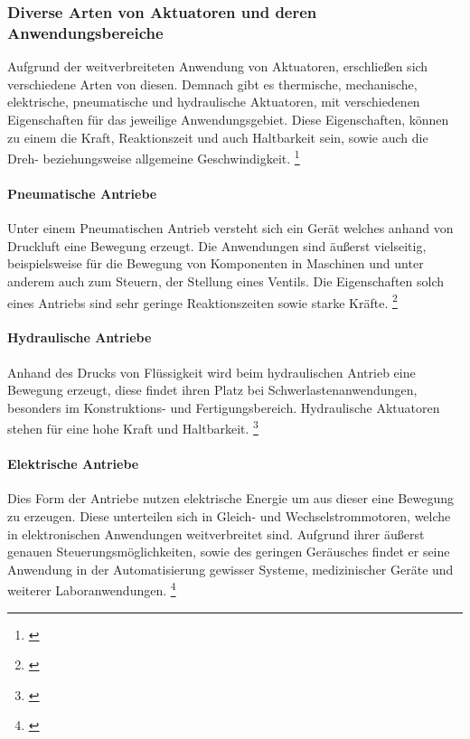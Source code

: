 \documentclass[titlepage,12pt,twoside]{article}
\begin{document}
\subsubsection{Diverse Arten von Aktuatoren und deren Anwendungsbereiche}
Aufgrund der weitverbreiteten Anwendung von Aktuatoren, erschließen sich 
verschiedene Arten von diesen. Demnach gibt es thermische, mechanische, 
elektrische, pneumatische und hydraulische Aktuatoren, mit verschiedenen 
Eigenschaften für das jeweilige Anwendungsgebiet. Diese Eigenschaften, 
können zu einem die Kraft, Reaktionszeit und auch Haltbarkeit sein, 
sowie auch die Dreh- beziehungsweise allgemeine Geschwindigkeit. \footnote{\cite{Q1}} \\
\paragraph{Pneumatische Antriebe}
\hfill \break
\hfill \break
Unter einem Pneumatischen Antrieb versteht sich ein Gerät welches anhand 
von Druckluft eine Bewegung erzeugt. Die Anwendungen sind äußerst 
vielseitig, beispielsweise für die Bewegung von Komponenten in Maschinen 
und unter anderem auch zum Steuern, der Stellung eines Ventils. Die 
Eigenschaften solch eines Antriebs sind sehr geringe Reaktionszeiten 
sowie starke Kräfte. \footnote{\cite{Q1}} \\
\paragraph{Hydraulische Antriebe}
\hfill \break
\hfill \break
Anhand des Drucks von Flüssigkeit wird beim hydraulischen Antrieb eine 
Bewegung erzeugt, diese findet ihren Platz bei Schwerlastenanwendungen, 
besonders im Konstruktions- und Fertigungsbereich. Hydraulische 
Aktuatoren stehen für eine hohe Kraft und Haltbarkeit. \footnote{\cite{Q1}} \\
\paragraph{Elektrische Antriebe}
\hfill \break
\hfill \break
Dies Form der Antriebe nutzen elektrische Energie um aus dieser eine 
Bewegung zu erzeugen. Diese unterteilen sich in Gleich- und 
Wechselstrommotoren, welche in elektronischen Anwendungen weitverbreitet 
sind. Aufgrund ihrer äußerst genauen Steuerungsmöglichkeiten, sowie des 
geringen Geräusches findet er seine Anwendung in der Automatisierung 
gewisser Systeme, medizinischer Geräte und weiterer Laboranwendungen. \footnote{\cite{Q1}} \\
\end{document}
